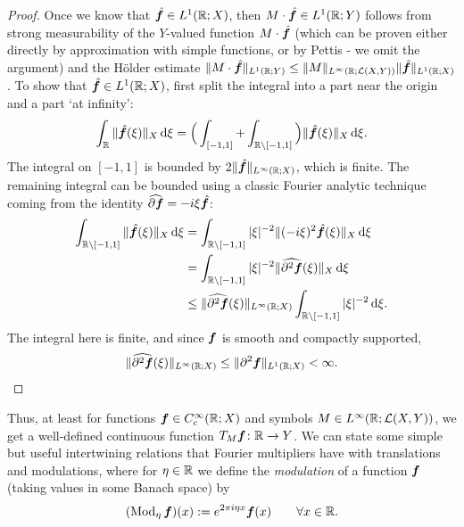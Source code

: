 {\begin{proof}
  Once we know that $\hat{\bm{f}} \in L^1(\mathbb{R};X)$, then $M \cdot \hat{\bm{f}} \in L^1(\mathbb{R};Y)$ follows from strong measurability of the $Y$-valued function $M \cdot \hat{\bm{f}}$ (which can be proven either directly by approximation with simple functions, or by Pettis - we omit the argument) and the H\"older estimate $\|M \cdot \hat{\bm{f}}\|_{L^1(\mathbb{R};Y)} \leq \|M\|_{L^\infty(\mathbb{R};\mathcal{L}(X,Y))} \|\hat{\bm{f}}\|_{L^1(\mathbb{R};X)}$.
  To show that $\hat{\bm{f}} \in L^1(\mathbb{R};X)$, first split the integral into a part near the origin and a part `at infinity':
  \begin{equation*}
    \int_{\mathbb{R}} \|\hat{\bm{f}}(\xi)\|_{X} \, \mathrm{d}\xi = \Big( \int_{[-1,1]} + \int_{\mathbb{R} \setminus [-1,1]} \Big) \|\hat{\bm{f}}(\xi)\|_{X} \, \mathrm{d}\xi.
  \end{equation*}
  The integral on $[-1,1]$ is bounded by $2\|\hat{\bm{f}}\|_{L^\infty(\mathbb{R};X)}$, which is finite.
  The remaining integral can be bounded using a classic Fourier analytic technique coming from the identity $\widehat{\partial \bm{f}} = -i\xi \hat{\bm{f}}$:
  \begin{equation*}
    \begin{aligned}
    \int_{\mathbb{R} \setminus [-1,1]} \|\hat{\bm{f}}(\xi)\|_{X} \, \mathrm{d}\xi
    &= \int_{\mathbb{R} \setminus [-1,1]} |\xi|^{-2} \|(-i\xi)^{2}\hat{\bm{f}}(\xi)\|_{X} \, \mathrm{d}\xi \\
    &= \int_{\mathbb{R} \setminus [-1,1]} |\xi|^{-2} \|\widehat{\partial^{2} \bm{f}}(\xi)\|_{X} \, \mathrm{d}\xi \\
    &\leq \|\widehat{\partial^{2} \bm{f}}(\xi)\|_{L^\infty(\mathbb{R};X)} \int_{\mathbb{R} \setminus [-1,1]} |\xi|^{-2} \, \mathrm{d}\xi .
  \end{aligned}
\end{equation*}
The integral here is finite, and since $\bm{f}$ is smooth and compactly supported, 
\begin{equation*}
   \|\widehat{\partial^{2} \bm{f}}(\xi)\|_{L^\infty(\mathbb{R};X)} \leq \|\partial^{2} \bm{f}\|_{L^1(\mathbb{R};X)} < \infty.
\end{equation*}
\end{proof}

Thus, at least for functions $\bm{f} \in C_{c}^\infty(\mathbb{R};X)$ and symbols $M \in L^\infty(\mathbb{R};\mathcal{L}(X,Y))$, we get a well-defined continuous function $T_{M}\bm{f} \colon \mathbb{R} \to Y$.
We can state some simple but useful intertwining relations that Fourier multipliers have with translations and modulations, where for $\eta \in \mathbb{R}$ we define the \emph{modulation} of a function $\bm{f}$ (taking values in some Banach space) by
\begin{equation*}
  (\operatorname{Mod}_{\eta} \bm{f})(x) := e^{2\pi i \eta x} \bm{f}(x) \qquad \forall x \in \mathbb{R}.
\end{equation*}

}
